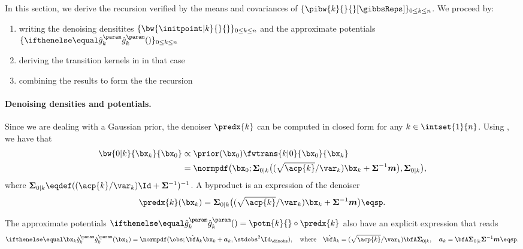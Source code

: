 In this section, we derive the recursion verified by the means and covariances of $\{ \pibw{k}{}{}[\gibbsReps] \}_{0 \leq k \leq n}$.
We proceed by:
\begin{enumerate}
    \item writing the denoising densitites $\{ \bw{\initpoint|k}{}{} \}_{0 \leq k \leq n}$ and the approximate potentials $\{ \hpotn{k}{} \}_{0 \leq k \leq n}$
    \item deriving the transition kernels in  in that case
    \item combining the results to form the the recursion
\end{enumerate}


\paragraph{Denoising densities and potentials.} Since we are dealing with a Gaussian prior, the denoiser $\predx{k}$ can be computed in closed form for any $k \in \intset{1}{n}$. Using \citet[Eqn.~2.116]{bishop2006pattern}, we have that
    \begin{align*}
        \bw{0|k}{\bx _k}{\bx _0}
            & \propto \prior(\bx _0) \fwtrans{k|0}{\bx _0}{\bx _k} \\
            & = \normpdf \big(\bx _0;
                \cov_{0|k} \big( (\sqrt{\acp{k}} / \var_k) \bx _k + \cov^{-1} \mean \big), \cov_{0|k} \big),
    \end{align*}
where $\cov_{0|k} \eqdef ((\acp{k} / \var_k) \Id + \cov^{-1})^{-1}$.
A byproduct is an expression of the denoiser
\begin{equation*}
    \predx{k}(\bx _k) = \cov_{0|k}\big( (\sqrt{\acp{k}} / \var_k) \bx _k + \cov^{-1} \mean \big)
    \eqsp.
\end{equation*}

The approximate potentials $\hpotn{k}{} = \potn{k}{} \circ \predx{k}$ also have an explicit expression that reads
\begin{equation*}
    \hpotn{k}{\bx _k}
        = \normpdf(\obs; \hat\bfA_k \bx _k + \potBias_k, \stdobs^2 \Id_\dimobs),
    \quad
    \mathrm{where}
    \quad
    \potLikelihood_k = (\sqrt{\acp{k}} / \var_k)  \likelihood \cov_{0|k}, \quad \potBias_k = \likelihood \cov_{0|k} \cov^{-1} \mean
    \eqsp.
\end{equation*}


